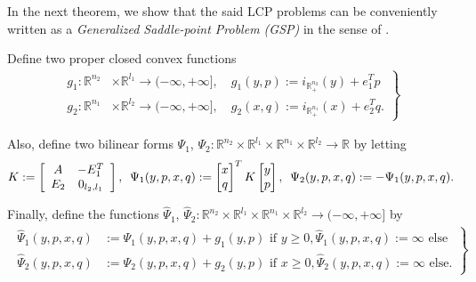 \documentclass[envcountsame]{llncs} %
\begin{document}
In the next theorem, we show that the said LCP problems can be
conveniently written as a \textit{Generalized Saddle-point Problem
  (GSP)} in the sense of \cite{he2013accelerating}.
\begin{theorem}
Define two proper closed convex functions
  \begin{eqnarray}
    \left.
    \begin{aligned}
      g_1: \mathbb{R}^{n_2} &\times \mathbb{R}^{l_1} \rightarrow
      (-\infty, +\infty], \hspace{1em} g_1(y, p) :=
        i_{\mathbb{R}^{n_2}_+}(y) + e_1^Tp\\
        g_2: \mathbb{R}^{n_1} &\times \mathbb{R}^{l_2} \rightarrow
        (-\infty, +\infty],\hspace{1em} g_2(x, q) :=
          i_{\mathbb{R}^{n_1}_+}(x) + e_2^Tq.
    \end{aligned}
    \right\}
    \label{eq:things}
  \end{eqnarray}

Also, define two bilinear forms $\Psi_1$, $\Psi_2: \mathbb{R}^{n_2}
\times \mathbb{R}^{l_1} \times \mathbb{R}^{n_1} \times
\mathbb{R}^{l_2} \rightarrow \mathbb{R}$ by letting
  \begin{equation}
      K :=
      \left[
        \begin{array}{cc}
          A & -E_1^T \\
          E_2 & 0_{l_2, l_1}
        \end{array}
        \right],\hspace{.5em}
    \Psi_1(y, p, x, q)
    := \begin{bmatrix}x\\q\end{bmatrix}^TK\begin{bmatrix}y\\p\end{bmatrix}, \hspace{.5em}
      \Psi_2(y, p, x, q) := -\Psi_1(y, p, x, q).
\end{equation}

Finally, define the functions $\hat{\Psi}_1$, $\hat{\Psi}_2:
\mathbb{R}^{n_2} \times \mathbb{R}^{l_1} \times \mathbb{R}^{n_1}
\times \mathbb{R}^{l_2} \rightarrow (-\infty, +\infty]$ by
\begin{eqnarray}
  \left.
  \begin{aligned}
    \hat{\Psi}_1(y, p, x, q) &:=
    \Psi_1(y, p, x, q)+ g_1(y, p) \text{ if }y \ge 0, \hat{\Psi}_1(y,
    p, x, q) := \infty \text{ else}\\
    \hat{\Psi}_2(y, p, x, q) &:= \Psi_2(y, p, x, q)+ g_2(y, p) \text{ if
    }x \ge 0, \hat{\Psi}_2(y,p, x, q) := \infty \text{ else}.
  \end{aligned}
  \right\}
\end{eqnarray}


\end{theorem}
\end{document}
